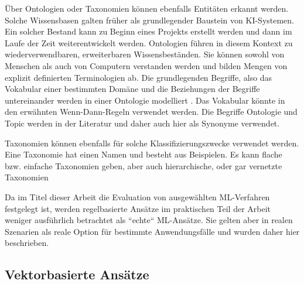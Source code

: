 Über Ontologien oder Taxonomien können ebenfalls Entitäten erkannt werden. Solche Wissensbasen galten früher als grundlegender Baustein von KI-Systemen. Ein solcher Bestand kann zu Beginn eines Projekts erstellt werden und dann im Laufe der Zeit weiterentwickelt werden. Ontologien führen in diesem Kontext zu wiederverwendbaren, erweiterbaren Wissensbeständen. Sie können sowohl von Menschen als auch von Computern verstanden werden und bilden Mengen von explizit definierten Terminologien ab. Die grundlegenden Begriffe, also das Vokabular einer bestimmten Domäne und die Beziehungen der Begriffe untereinander werden in einer Ontologie modelliert \cite[S. 37-55]{ontologies}. Das Vokabular könnte in den erwähnten Wenn-Dann-Regeln verwendet werden. Die Begriffe Ontologie und Topic werden in der Literatur und daher auch hier als Synonyme verwendet. 

Taxonomien können ebenfalls für solche Klassifizierungszwecke verwendet werden. Eine Taxonomie hat einen Namen und besteht aus Beispielen. Es kann flache bzw. einfache Taxonomien geben, aber auch hierarchische, oder gar vernetzte Taxonomien \cite{inmon}

Da im Titel dieser Arbeit die Evaluation von ausgewählten ML-Verfahren festgelegt ist, werden regelbasierte Ansätze im praktischen Teil der Arbeit weniger ausführlich betrachtet als ``echte`` ML-Ansätze. Sie gelten aber in realen Szenarien als reale Option für bestimmte Anwendungsfälle und wurden daher hier beschrieben.

\subsection{Vektorbasierte Ansätze}

